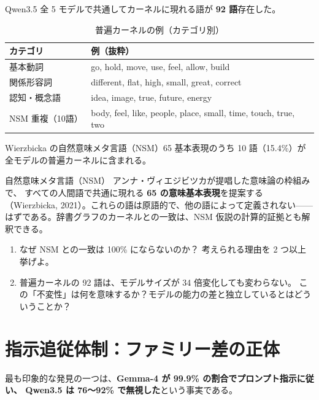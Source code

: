 \documentclass[lang=jp, color=black, mode=simple, 11pt]{elegantbook}
\begin{document}
Qwen3.5 全 5 モデルで共通してカーネルに現れる語が \textbf{92 語}存在した。

\begin{table}[htbp]
\centering
\caption{普遍カーネルの例（カテゴリ別）}
\begin{tabular}{ll}
\toprule
カテゴリ & 例（抜粋） \\
\midrule
基本動詞 & go, hold, move, use, feel, allow, build \\
関係形容詞 & different, flat, high, small, great, correct \\
認知・概念語 & idea, image, true, future, energy \\
\midrule
NSM 重複（10語） & body, feel, like, people, place, small, time, touch, true, two \\
\bottomrule
\end{tabular}
\end{table}

Wierzbicka の自然意味メタ言語（NSM）65 基本表現のうち 10 語（15.4\%）が
全モデルの普遍カーネルに含まれる。

\begin{dsterm}{自然意味メタ言語（NSM）}
  アンナ・ヴィエジビツカが提唱した意味論の枠組みで、
  すべての人間語で共通に現れる \textbf{65 の意味基本表現}を提案する
  （Wierzbicka, 2021）。これらの語は原語的で、他の語によって定義されない——
  はずである。辞書グラフのカーネルとの一致は、NSM 仮説の計算的証拠とも解釈できる。
\end{dsterm}

\begin{reflect}
\begin{enumerate}
  \item なぜ NSM との一致は 100\% にならないのか？
        考えられる理由を 2 つ以上挙げよ。
  \item 普遍カーネルの 92 語は、モデルサイズが 34 倍変化しても変わらない。
        この「不変性」は何を意味するか？モデルの能力の差と独立しているとはどういうことか？
\end{enumerate}
\end{reflect}

\section{指示追従体制：ファミリー差の正体}

最も印象的な発見の一つは、\textbf{Gemma-4 が 99.9\% の割合でプロンプト指示に従い、
Qwen3.5 は 76〜92\% で無視した}という事実である。
\end{document}

